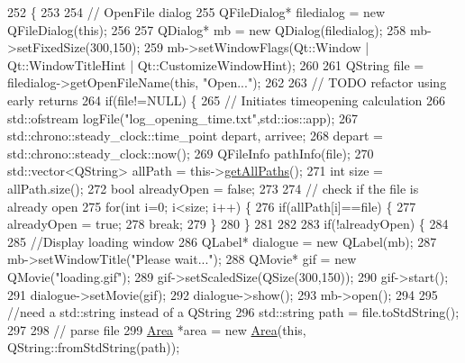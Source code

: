 \begin{DoxyCode}
252                             \{
253 
254     \textcolor{comment}{// OpenFile dialog}
255     QFileDialog* filedialog = \textcolor{keyword}{new} QFileDialog(\textcolor{keyword}{this});
256 
257     QDialog* mb = \textcolor{keyword}{new} QDialog(filedialog);
258     mb->setFixedSize(300,150);
259     mb->setWindowFlags(Qt::Window | Qt::WindowTitleHint | Qt::CustomizeWindowHint);
260 
261     QString file = filedialog->getOpenFileName(\textcolor{keyword}{this}, \textcolor{stringliteral}{"Open..."});
262 
263     \textcolor{comment}{// TODO refactor using early returns}
264     \textcolor{keywordflow}{if}(file!=NULL) \{
265         \textcolor{comment}{// Initiates timeopening calculation}
266         std::ofstream logFile(\textcolor{stringliteral}{"log\_opening\_time.txt"},std::ios::app);
267         std::chrono::steady\_clock::time\_point depart, arrivee;
268         depart = std::chrono::steady\_clock::now();
269         QFileInfo pathInfo(file);
270         std::vector<QString> allPath = this->\hyperlink{classMainWindow_afabdfcfe9a925f3b91d93980da94068e}{getAllPaths}();
271         \textcolor{keywordtype}{int} size = allPath.size();
272         \textcolor{keywordtype}{bool} alreadyOpen = \textcolor{keyword}{false};
273 
274         \textcolor{comment}{// check if the file is already open}
275         \textcolor{keywordflow}{for}(\textcolor{keywordtype}{int} i=0; i<size; i++) \{
276             \textcolor{keywordflow}{if}(allPath[i]==file) \{
277                 alreadyOpen = \textcolor{keyword}{true};
278                 \textcolor{keywordflow}{break};
279             \}
280         \}
281 
282 
283         \textcolor{keywordflow}{if}(!alreadyOpen) \{
284 
285             \textcolor{comment}{//Display loading window}
286             QLabel* dialogue = \textcolor{keyword}{new} QLabel(mb);
287             mb->setWindowTitle(\textcolor{stringliteral}{"Please wait..."});
288             QMovie* gif = \textcolor{keyword}{new} QMovie(\textcolor{stringliteral}{"loading.gif"});
289             gif->setScaledSize(QSize(300,150));
290             gif->start();
291             dialogue->setMovie(gif);
292             dialogue->show();
293             mb->open();
294 
295             \textcolor{comment}{//need a std::string instead of a QString}
296             std::string path =  file.toStdString();
297 
298             \textcolor{comment}{// parse file}
299             \hyperlink{classArea}{Area} *area = \textcolor{keyword}{new} \hyperlink{classArea}{Area}(\textcolor{keyword}{this}, QString::fromStdString(path));

\end{DoxyCode}
